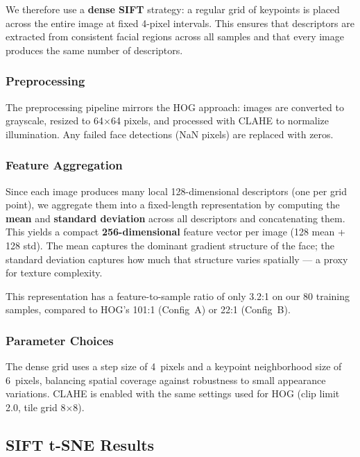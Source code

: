 \documentclass[a4paper,10pt]{article}
\begin{document}
We therefore use a \textbf{dense SIFT} strategy: a regular grid of keypoints is placed across the entire image at fixed 4-pixel intervals.
This ensures that descriptors are extracted from consistent facial regions across all samples and that every image produces the same number of descriptors.

\subsubsection{Preprocessing}

The preprocessing pipeline mirrors the HOG approach: images are converted to grayscale, resized to 64$\times$64 pixels, and processed with CLAHE to normalize illumination.
Any failed face detections (NaN pixels) are replaced with zeros.

\subsubsection{Feature Aggregation}

Since each image produces many local 128-dimensional descriptors (one per grid point), we aggregate them into a fixed-length representation by computing the \textbf{mean} and \textbf{standard deviation} across all descriptors and concatenating them.
This yields a compact \textbf{256-dimensional} feature vector per image (128 mean + 128 std).
The mean captures the dominant gradient structure of the face; the standard deviation captures how much that structure varies spatially --- a proxy for texture complexity.

This representation has a feature-to-sample ratio of only 3.2:1 on our 80 training samples, compared to HOG's 101:1 (Config~A) or 22:1 (Config~B).

\subsubsection{Parameter Choices}

The dense grid uses a step size of 4~pixels and a keypoint neighborhood size of 6~pixels, balancing spatial coverage against robustness to small appearance variations.
CLAHE is enabled with the same settings used for HOG (clip limit 2.0, tile grid 8$\times$8).

\subsection{SIFT t-SNE Results}
\end{document}
